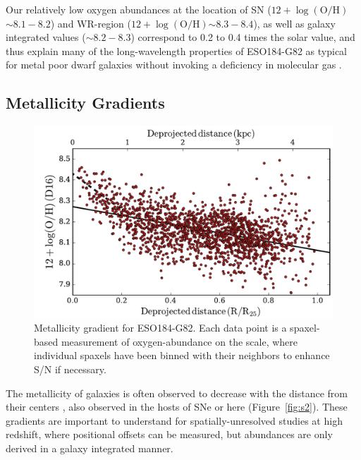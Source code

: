 \documentclass[traditabstract]{aa}
\newcommand{\oh}{$12+\log(\mathrm{O/H})$}
\begin{document}
Our relatively low oxygen abundances at the location of SN (\oh$\sim8.1-8.2$) and WR-region (\oh$\sim8.3-8.4$), as well as galaxy integrated values ($\sim8.2-8.3$) correspond to 0.2 to 0.4 times the solar value, and thus explain many of the long-wavelength properties of ESO184-G82 as typical for metal poor dwarf galaxies without invoking a deficiency in molecular gas \citep{2016arXiv160901742M}.


\subsection{Metallicity Gradients}
\label{sec:metgrad}

\begin{figure}
\includegraphics[angle=0, width=0.99\columnwidth]{Figs/MUSE_SN1998bw_metgrad.pdf}
\caption{Metallicity gradient for ESO184-G82. Each data point is a spaxel-based measurement of oxygen-abundance on the \citet{2016Ap&SS.361...61D} scale, where individual spaxels have been binned with their neighbors to enhance S/N if necessary.}
\label{fig:metgrad}
\end{figure}

The metallicity of galaxies is often observed to decrease with the distance from their centers \citep[e.g.][]{1994ApJ...420...87Z, 2014A&A...563A..49S}, also observed in the hosts of SNe \citep{2016A&A...591A..48G} or here (Figure~\ref{fig:s2}). These gradients are important to understand for spatially-unresolved studies at high redshift, where positional offsets can be measured, but abundances are only derived in a galaxy integrated manner. 
\end{document}

